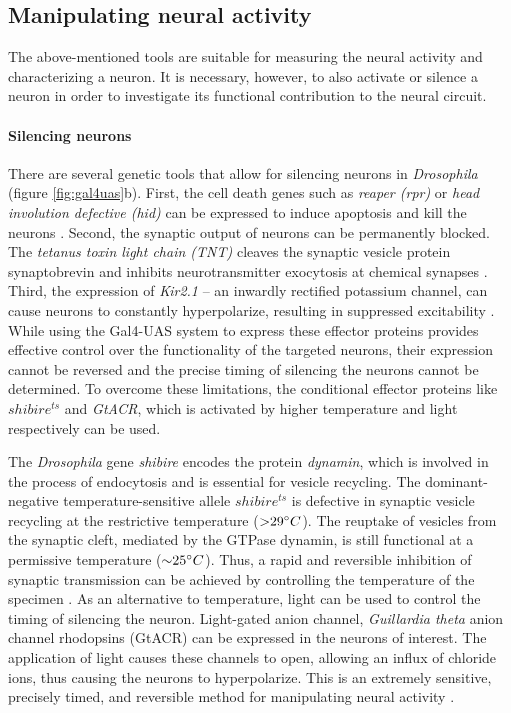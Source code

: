 \subsection{Manipulating neural activity}

The above-mentioned tools are suitable for measuring the neural activity and characterizing a neuron. It is necessary, however, to also activate or silence a neuron in order to investigate its functional contribution to the neural circuit. 

\paragraph{Silencing neurons}
There are several genetic tools that allow for silencing neurons in \textit{Drosophila} (figure \ref{fig:gal4uas}b). First, the cell death genes such as \textit{reaper (rpr)} or \textit{head involution defective (hid)} can be expressed to induce apoptosis and kill the neurons \parencite{Chen1996, Grether1995}. Second, the synaptic output of neurons can be permanently blocked. The \textit{tetanus toxin light chain (TNT)} cleaves the synaptic vesicle protein synaptobrevin and inhibits neurotransmitter exocytosis at chemical synapses \parencite{Sweeney1995}. Third, the expression of \textit{Kir2.1} -- an inwardly rectified potassium channel, can cause neurons to constantly hyperpolarize, resulting in suppressed excitability \parencite{Johns1999}. While using the Gal4-UAS system to express these effector proteins provides effective control over the functionality of the targeted neurons, their expression cannot be reversed and the precise timing of silencing the neurons cannot be determined. To overcome these limitations, the conditional effector proteins like \textit{$shibire^{ts}$} and \textit{GtACR}, which is activated by higher temperature and light respectively can be used. 

The \textit{Drosophila} gene \textit{shibire} encodes the protein \textit{dynamin}, which is involved in the process of endocytosis and is essential for vesicle recycling. The dominant-negative temperature-sensitive allele $shibire^{ts}$ is defective in synaptic vesicle recycling at the restrictive temperature (${>}29\degree C$). The reuptake of vesicles from the synaptic cleft, mediated by the GTPase dynamin, is still functional at a permissive temperature (${\sim}25\degree C$). Thus, a rapid and reversible inhibition of synaptic transmission can be achieved by controlling the temperature of the specimen \parencite{Kitamoto2001}. As an alternative to temperature, light can be used to control the timing of silencing the neuron. Light-gated anion channel, \textit{Guillardia theta} anion channel rhodopsins (GtACR) can be expressed in the neurons of interest. The application of light causes these channels to open, allowing an influx of chloride ions, thus causing the neurons to hyperpolarize. This is an extremely sensitive, precisely timed, and reversible method for manipulating neural activity \parencite{Govorunova2015, Mauss2017, Mohammad2017}.


